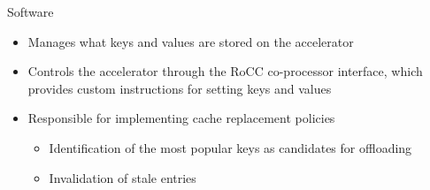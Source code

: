 \begin{block}{Software}
\begin{itemize}
\footnotesize
\item Manages what keys and values are stored on the accelerator
\item Controls the accelerator through the RoCC co-processor interface, which
	provides custom instructions for setting keys and values
\item Responsible for implementing cache replacement policies
	\begin{itemize}
	\footnotesize
	\item Identification of the most popular keys as candidates for offloading
	\item Invalidation of stale entries
	\end{itemize}
\end{itemize}


\end{block}
